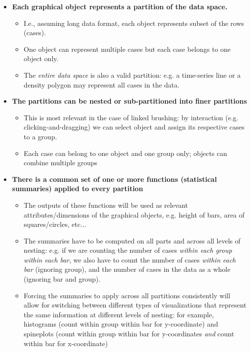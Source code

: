 \documentclass[12pt,a4paper]{article}
\begin{document}
\begin{itemize}

\item \textbf{Each graphical object represents a partition of the data space.}
  \begin{itemize}
  \item I.e., assuming long data format, each object represents subset of the rows (cases).
  \item One object can represent multiple cases but each case belongs to one object only.
  \item The \textit{entire data space} is also a valid partition: e.g. a time-series line or a density polygon may represent all cases in the data.
  \end{itemize}
  
\item \textbf{The partitions can be nested or sub-partitioned into finer partitions}
  \begin{itemize}

  \item This is most relevant in the case of linked brushing: by interaction (e.g. clicking-and-dragging) we can select object and assign its respective cases to a group.
  \item Each case can belong to one object and one group only; objects can combine multiple groups
  \end{itemize}

\item \textbf{There is a common set of one or more functions (statistical summaries) applied to every partition}

  \begin{itemize}
  \item The outputs of these functions will be used as relevant attributes/dimensions of the graphical objects, e.g. height of bars, area of squares/circles, etc...
  \item The summaries have to be computed on all parts and across all levels of nesting: e.g. if we are counting the number of cases \textit{within each group within each bar}, we also have to count the number of cases \textit{within each bar} (ignoring group), and the number of cases in the data as a whole (ignoring bar and group). 
  \item Forcing the summaries to apply across all partitions consistently will allow for switching between different types of visualizations that represent the same information at different levels of nesting: for example, histograms (count within group within bar for y-coordinate) and spineplots (count within group within bar for y-coordinates \textit{and} count within bar for x-coordinate)
  \end{itemize}


\end{itemize}
\end{document}
